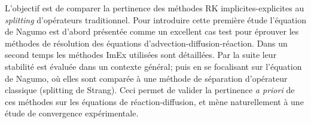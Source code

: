 \label{par:contrib_imex}
L'objectif est de comparer la pertinence des méthodes RK implicites-explicites au \textit{splitting} d'opérateurs traditionnel.
Pour introduire cette première étude l'équation de Nagumo est d'abord présentée comme un excellent cas
test pour éprouver les méthodes de résolution des équations d'advection-diffusion-réaction. 
Dans un second temps les méthodes ImEx utilisées sont détaillées. Par la suite leur stabilité
est évaluée dans un contexte général; puis en se focalisant sur l'équation de Nagumo, où elles sont comparée 
à une méthode de séparation d'opérateur classique (splitting de Strang).
Ceci permet de valider la pertinence \textit{a priori} de ces méthodes sur les équations de réaction-diffusion, 
et mène naturellement à une étude de convergence expérimentale.